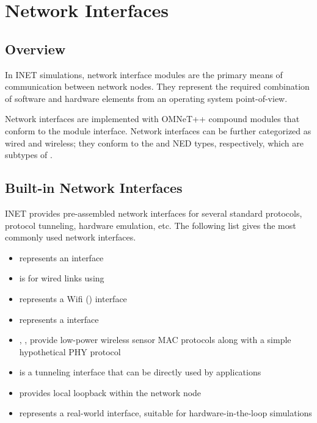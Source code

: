 \chapter{Network Interfaces}
\label{cha:network-interfaces}

\section{Overview}
\label{sec:interfaces:overview}


In INET simulations, network interface modules are the primary means of
communication between network nodes. They represent the required
combination of software and hardware elements from an operating system
point-of-view.

Network interfaces are implemented with OMNeT++ compound modules that
conform to the  module interface.
Network interfaces can be further categorized as wired and wireless;
they conform to the  and 
NED types, respectively, which are subtypes of .

\section{Built-in Network Interfaces}
\label{sec:interfaces:built-in-network-interfaces}

INET provides pre-assembled network interfaces for several standard
protocols, protocol tunneling, hardware emulation, etc. The following list
gives the most commonly used network interfaces.

\begin{itemize}
    \item {} represents an  interface
    \item {} is for wired links using 
    \item {} represents a Wifi () interface
    \item {} represents a  interface
    \item {}, ,  provide
      low-power wireless sensor MAC protocols along with a simple hypothetical PHY protocol
    \item {} is a tunneling interface that can be directly used by applications
    \item {} provides local loopback within the network node
    \item {} represents a real-world interface, suitable for hardware-in-the-loop simulations
\end{itemize}

